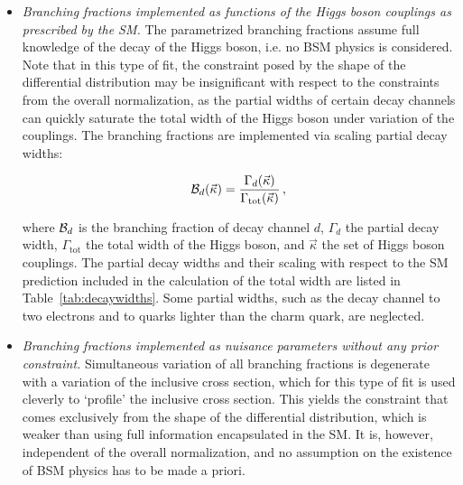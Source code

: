 \begin{itemize}
\item
    \emph{Branching fractions implemented as functions of the Higgs boson couplings as prescribed by the SM.}
    The parametrized branching fractions assume full knowledge of the decay of the Higgs boson, i.e. no BSM physics is considered.
    Note that in this type of fit, the constraint posed by the shape of the differential distribution may be insignificant with respect to the constraints from the overall normalization, as the partial widths of certain decay channels can quickly saturate the total width of the Higgs boson under variation of the couplings.
    The branching fractions are implemented via scaling partial decay widths:
    \begin{linenomath*}
    \begin{equation}
    \mathcal{B}_d (\vec{\kappa}) = 
        \frac{
        \Gamma_d(\vec{\kappa})
        }{
        \Gamma_\text{tot}(\vec{\kappa})
        }
    \,,
    \end{equation}
    \end{linenomath*}
    where $\mathcal{B}_d$ is the branching fraction of decay channel $d$, $\Gamma_d$ the partial decay width, $\Gamma_\text{tot}$ the total width of the Higgs boson, and $\vec{\kappa}$ the set of Higgs boson couplings.
    The partial decay widths and their scaling with respect to the SM prediction included in the calculation of the total width are listed in Table~\ref{tab:decaywidths}.
    Some partial widths, such as the decay channel to two electrons and to quarks lighter than the charm quark, are neglected.
% 
\item
    \emph{Branching fractions implemented as nuisance parameters without any prior constraint.}
    Simultaneous variation of all branching fractions is degenerate with a variation of the inclusive cross section, which for this type of fit is used cleverly to `profile' the inclusive cross section.
    This yields the constraint that comes exclusively from the shape of the differential distribution, which is weaker than using full information encapsulated in the SM.
    It is, however, independent of the overall normalization, and no assumption on the existence of BSM physics has to be made a priori.
\end{itemize}


